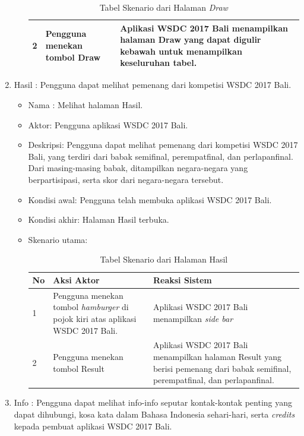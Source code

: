\begin{enumerate}
\begin{itemize}
\begin{table}[H]
\begin{tabular}{|p{0.5cm}|p{7cm}|p{7cm}|}
				2  & Pengguna menekan tombol Draw & Aplikasi WSDC 2017 Bali menampilkan halaman Draw yang dapat digulir kebawah untuk menampilkan keseluruhan tabel. \\ \hline
			\end{tabular}
			\caption{Tabel Skenario dari Halaman {\it Draw}}
			\label{table:skenarioHalamanDraw}
		\end{table}
	\end{itemize}
	\item Hasil : Pengguna dapat melihat pemenang dari kompetisi WSDC 2017 Bali.
	\begin{itemize}
		\item Nama : Melihat halaman Hasil.
		\item Aktor: Pengguna aplikasi WSDC 2017 Bali.
		\item Deskripsi: Pengguna dapat melihat pemenang dari kompetisi WSDC 2017 Bali, yang terdiri dari babak semifinal, perempatfinal, dan perlapanfinal. Dari masing-masing babak, ditampilkan negara-negara yang berpartisipasi, serta skor dari negara-negara tersebut. 
		\item Kondisi awal: Pengguna telah membuka aplikasi WSDC 2017 Bali.
		\item Kondisi akhir: Halaman Hasil terbuka.
		\item Skenario utama: \\
		\begin{table}[H]
			\centering
			\begin{tabular}{|p{0.5cm}|p{7cm}|p{7cm}|}
				\hline
				No & Aksi Aktor                               & Reaksi Sistem                                          \\ \hline
				1  & Pengguna menekan tombol {\it hamburger} di pojok kiri atas aplikasi WSDC 2017 Bali. & Aplikasi WSDC 2017 Bali menampilkan {\it side bar} \\ \hline
				2  & Pengguna menekan tombol Result & Aplikasi WSDC 2017 Bali menampilkan halaman Result yang berisi pemenang dari babak semifinal, perempatfinal, dan perlapanfinal. \\ \hline
			\end{tabular}
			\caption{Tabel Skenario dari Halaman Hasil}
			\label{table:skenarioHalamanHasil}
		\end{table}
	\end{itemize}
	\item Info : Pengguna dapat melihat info-info seputar kontak-kontak penting yang dapat dihubungi, kosa kata dalam Bahasa Indonesia sehari-hari, serta {\it credits} kepada pembuat aplikasi WSDC 2017 Bali.

\end{enumerate}
